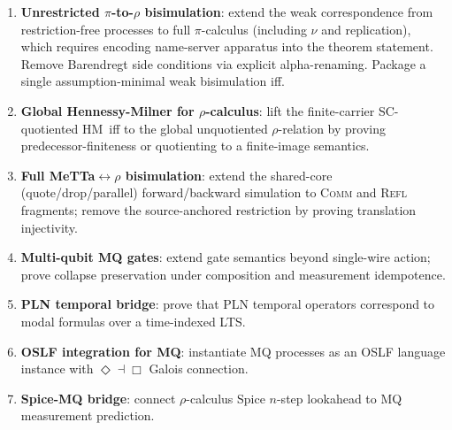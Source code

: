 \documentclass[11pt]{article}
\theoremstyle{definition}
\theoremstyle{remark}
\begin{document}
\begin{enumerate}[leftmargin=1.5em]
  \item \textbf{Unrestricted $\pi$-to-$\rho$ bisimulation}: extend the
    weak correspondence from restriction-free processes to full
    $\pi$-calculus (including $\nu$ and replication), which requires
    encoding name-server apparatus into the theorem statement.  Remove
    Barendregt side conditions via explicit alpha-renaming.  Package a
    single assumption-minimal weak bisimulation iff.
  \item \textbf{Global Hennessy-Milner for $\rho$-calculus}: lift the
    finite-carrier SC-quotiented HM~iff to the global unquotiented
    $\rho$-relation by proving predecessor-finiteness or quotienting to
    a finite-image semantics.
  \item \textbf{Full MeTTa$\leftrightarrow$$\rho$ bisimulation}: extend
    the shared-core (quote/drop/parallel) forward/backward simulation to
    \textsc{Comm} and \textsc{Refl} fragments; remove the
    source-anchored restriction by proving translation injectivity.
  \item \textbf{Multi-qubit MQ gates}: extend gate semantics beyond
    single-wire action; prove collapse preservation under composition
    and measurement idempotence.
  \item \textbf{PLN temporal bridge}: prove that PLN temporal operators
    correspond to modal formulas over a time-indexed LTS.
  \item \textbf{OSLF integration for MQ}: instantiate MQ processes as an
    OSLF language instance with $\Diamond \dashv \Box$ Galois
    connection.
  \item \textbf{Spice-MQ bridge}: connect $\rho$-calculus Spice
    $n$-step lookahead to MQ measurement prediction.
\end{enumerate}



\end{document}
